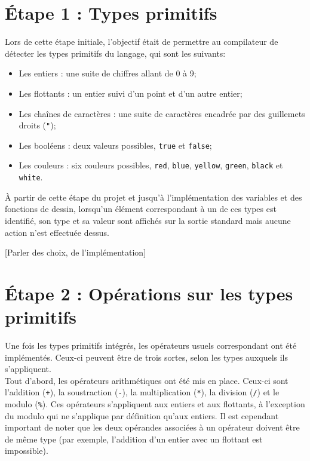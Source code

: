 \documentclass[a4paper, 12pt]{report}
\begin{document}
\chapter{\'Etape 1 : Types primitifs}
    
    Lors de cette étape initiale, l'objectif était de permettre au compilateur de détecter les types primitifs du langage, qui sont les suivants:\\
    
    \begin{itemize}
    	\item Les entiers : une suite de chiffres allant de 0 à 9;
    	\item Les flottants : un entier suivi d'un point et d'un autre entier;
    	\item Les cha\^ines de caractères : une suite de caractères encadrée par des guillemets droits (\texttt{"});
    	\item Les booléens : deux valeurs possibles, \texttt{true} et \texttt{false};
    	\item Les couleurs : six couleurs possibles, \texttt{red}, \texttt{blue}, \texttt{yellow}, \texttt{green}, \texttt{black} et \texttt{white}.\\
    \end{itemize}
    
    \`A partir de cette étape du projet et jusqu'à l'implémentation des variables et des fonctions de dessin, lorsqu'un élément correspondant à un de ces types est identifié, son type et sa valeur sont affichés sur la sortie standard mais aucune action n'est effectuée dessus.
    
    [Parler des choix, de l'implémentation]
    
\chapter{\'Etape 2 : Opérations sur les types primitifs}

	Une fois les types primitifs intégrés, les opérateurs usuels correspondant ont été implémentés. Ceux-ci peuvent être de trois sortes, selon les types auxquels ils s'appliquent.\\
	
	Tout d'abord, les opérateurs arithmétiques ont été mis en place. Ceux-ci sont l'addition (\texttt{+}), la soustraction (\texttt{-}), la multiplication (\texttt{*}), la division (\texttt{/}) et le modulo (\texttt{\%}). Ces opérateurs s'appliquent aux entiers et aux flottants, à l'exception du modulo qui ne s'applique par définition qu'aux entiers. Il est cependant important de noter que les deux opérandes associées à un opérateur doivent être de même type (par exemple, l'addition d'un entier avec un flottant est impossible).\\
\end{document}

